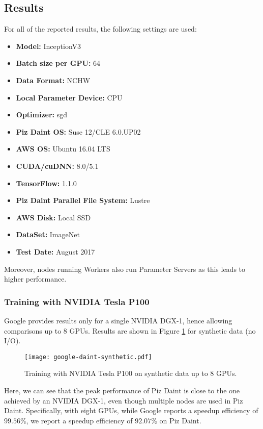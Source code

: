\subsection{Results}
For all of the reported results, the following settings are used: 
\begin{itemize}
	\item \textbf{Model:} InceptionV3
	\item \textbf{Batch size per GPU:} 64
    \item \textbf{Data Format:} NCHW
    \item \textbf{Local Parameter Device:} CPU
	\item \textbf{Optimizer:} sgd
    \item \textbf{Piz Daint OS:} Suse 12/CLE 6.0.UP02
    \item \textbf{AWS OS:} Ubuntu 16.04 LTS
    \item \textbf{CUDA/cuDNN:} 8.0/5.1
    \item \textbf{TensorFlow:} 1.1.0
    \item \textbf{Piz Daint Parallel File System:} Lustre
    \item \textbf{AWS Disk:} Local SSD
    \item \textbf{DataSet:} ImageNet
	\item \textbf{Test Date:} August 2017
\end{itemize}
Moreover, nodes running Workers also run Parameter Servers as this leads to higher performance.

\subsubsection{Training with NVIDIA Tesla P100}
Google provides results only for a single NVIDIA DGX-1, hence allowing comparisons up to 8 GPUs.
Results are shown in Figure \ref{fig:dgx-daint} for synthetic data (no I/O).
\begin{figure}[t]
  \centering
  \texttt{[image: google-daint-synthetic.pdf]}
  \vspace{-0.85cm}
  \caption{Training with NVIDIA Tesla P100 on synthetic data up to 8 GPUs.} 
  \label{fig:dgx-daint}
\end{figure}
Here, we can see that the peak performance of Piz Daint is close to the one achieved by an NVIDIA DGX-1, even though multiple nodes are used in Piz Daint.
Specifically, with eight GPUs, while Google reports a speedup efficiency of $99.56\%$, we report a speedup efficiency of $92.07\%$ on Piz Daint.

